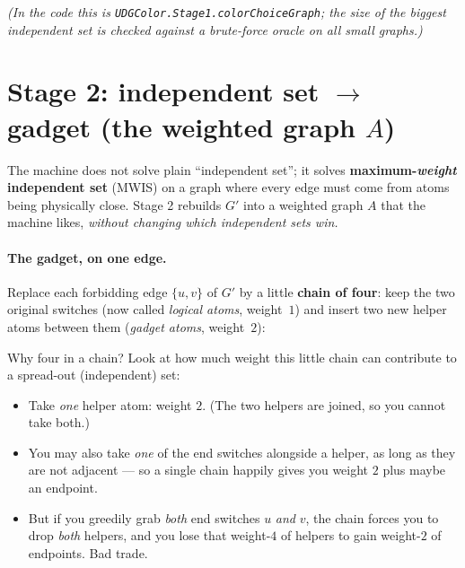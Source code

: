 \documentclass[11pt]{article}
\begin{document}
\medskip
\noindent\emph{(In the code this is \texttt{UDGColor.Stage1.colorChoiceGraph}; the
size of the biggest independent set is checked against a brute-force oracle on all
small graphs.)}

\section{Stage 2: independent set $\to$ gadget (the weighted graph $A$)}

The machine does not solve plain ``independent set''; it solves
\textbf{maximum-\emph{weight} independent set} (MWIS) on a graph where every edge
must come from atoms being physically close. Stage 2 rebuilds $G'$ into a weighted
graph $A$ that the machine likes, \emph{without changing which independent sets
win.}

\paragraph{The gadget, on one edge.} Replace each forbidding edge $\{u,v\}$ of
$G'$ by a little \textbf{chain of four}: keep the two original switches (now
called \emph{logical atoms}, weight~$1$) and insert two new helper atoms between
them (\emph{gadget atoms}, weight~$2$):

\begin{center}
\end{center}

Why four in a chain? Look at how much weight this little chain can contribute to a
spread-out (independent) set:

\begin{itemize}[leftmargin=1.6em,itemsep=2pt]
  \item Take \emph{one} helper atom: weight $2$. (The two helpers are joined, so
        you cannot take both.)
  \item You may also take \emph{one} of the end switches alongside a helper, as
        long as they are not adjacent --- so a single chain happily gives you
        weight $2$ plus maybe an endpoint.
  \item But if you greedily grab \emph{both} end switches $u$ \emph{and} $v$, the
        chain forces you to drop \emph{both} helpers, and you lose that weight-$4$
        of helpers to gain weight-$2$ of endpoints. Bad trade.
\end{itemize}
\end{document}
